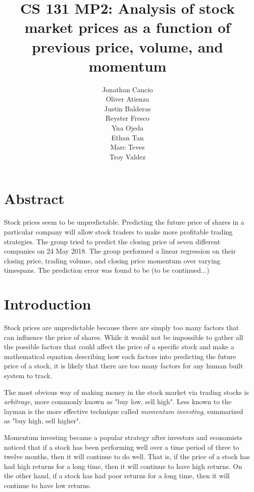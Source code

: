 \documentclass[8pt]{article}
\begin{document}
	\author{Jonathan Cancio \\ Oliver Atienza \\ Justin Balderas \\ 
	Reyster Fresco \\ Yna Ojeda \\ Ethan Tan \\ Marc Teves \\ Troy Valdez}
	\title{CS 131 MP2: Analysis of stock market prices as a function of previous price, volume, and momentum}
	\maketitle
	\section{Abstract}
	Stock prices seem to be unpredictable.
	Predicting the future price of shares in a particular company will allow stock traders to make more profitable trading strategies.
	The group tried to predict the closing price of seven different companies on 24 May 2018. 
	The group performed a linear regression on their closing price, trading volume, and closing price momentum over varying timespans.
	The prediction error was found to be (to be continued...)
	\section{Introduction}

	Stock prices are unpredictable because there are simply too many factors that can influence the price of shares.
	While it would not be impossible to gather all the possible factors that could affect the price of a specific stock and make a mathematical equation describing how each factors into predicting the future price of a stock, it is likely that there are too many factors for any human built system to track.

	The most obvious way of making money in the stock market via trading stocks is \textit{arbitrage}, more commonly known as "buy low, sell high".
	Less known to the layman is the more effective technique called \textit{momentum investing}, summarized as "buy high, sell higher". 

	Momentum investing became a popular strategy after investors and economists noticed that if a stock has been performing well over a time period of three to twelve months, then it will continue to do well.
	That is, if the price of a stock has had high returns for a long time, then it will continue to have high returns.
	On the other hand, if a stock has had poor returns for a long time, then it will continue to have low returns.
\end{document}
